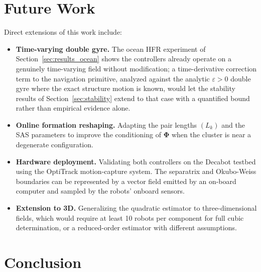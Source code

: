 \documentclass[12pt, letterpaper, oneside]{report}
\begin{document}
\section{Future Work}
\label{sec:sep_future}

Direct extensions of this work include:
\begin{itemize}
    \item \textbf{Time-varying double gyre.} The ocean HFR experiment of
          Section~\ref{sec:results_ocean} shows the controllers already
          operate on a genuinely time-varying field without modification;
          a time-derivative correction term to the navigation primitive,
          analyzed against the analytic $\varepsilon > 0$ double gyre where
          the exact structure motion is known, would let the stability
          results of Section~\ref{sec:stability} extend to that case with
          a quantified bound rather than empirical evidence alone.
    \item \textbf{Online formation reshaping.} Adapting the pair lengths
          $(L_k)$ and the SAS parameters to improve the conditioning of
          $\boldsymbol{\Phi}$ when the cluster is near a degenerate
          configuration.
    \item \textbf{Hardware deployment.} Validating both controllers on the
          Decabot testbed using the OptiTrack motion-capture system. The
          separatrix and Okubo-Weiss boundaries can be represented by a
          vector field emitted by an on-board computer and sampled by
          the robots' onboard sensors.
    \item \textbf{Extension to 3D.} Generalizing the quadratic estimator
          to three-dimensional fields, which would require at least 10 robots
          per component for full cubic determination, or a reduced-order
          estimator with different assumptions.
\end{itemize}

\section{Conclusion}
\label{sec:sep_conclusion}
\end{document}
